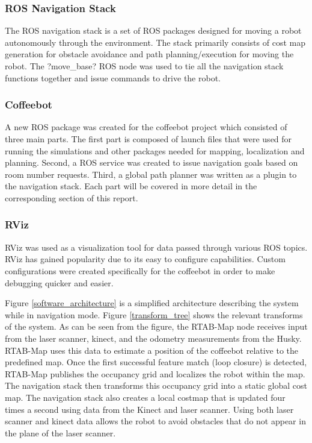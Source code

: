 \documentclass[letterpaper, 10 pt, conference]{ieeeconf}  %
\begin{document}
\subsubsection{ROS Navigation Stack}

The ROS navigation stack is a set of ROS packages designed for moving a robot autonomously through the environment. The stack primarily consists of cost map generation for obstacle avoidance and path planning/execution for moving the robot. The ?move\_base? ROS node was used to tie all the navigation stack functions together and issue commands to drive the robot. 

\subsubsection{Coffeebot}

A new ROS package was created for the coffeebot project which consisted of three main parts. The first part is composed of launch files that were used for running the simulations and other packages needed for mapping, localization and planning. Second, a ROS service was created to issue navigation goals based on room number requests. Third, a global path planner was written as a plugin to the navigation stack. Each part will be covered in more detail in the corresponding section of this report. 

\subsubsection{RViz}

RViz was used as a visualization tool for data passed through various ROS topics. RViz has gained popularity due to its easy to configure capabilities. Custom configurations were created specifically for the coffeebot in order to make debugging quicker and easier. 

Figure \ref{software_architecture} is a simplified architecture describing the system while in navigation mode. Figure \ref{transform_tree} shows the relevant transforms of the system. As can be seen from the figure, the RTAB-Map node receives input from the laser scanner, kinect, and the odometry measurements from the Husky. RTAB-Map uses this data to estimate a position of the coffeebot relative to the predefined map. Once the first successful feature match (loop closure) is detected, RTAB-Map publishes the occupancy grid and localizes the robot within the map.  The navigation stack then transforms this occupancy grid into a static global cost map. The navigation stack also creates a local costmap that is updated four times a second using data from the Kinect and laser scanner. Using both laser scanner and kinect data allows the robot to avoid obstacles that do not appear in the plane of the laser scanner. 
\end{document}
